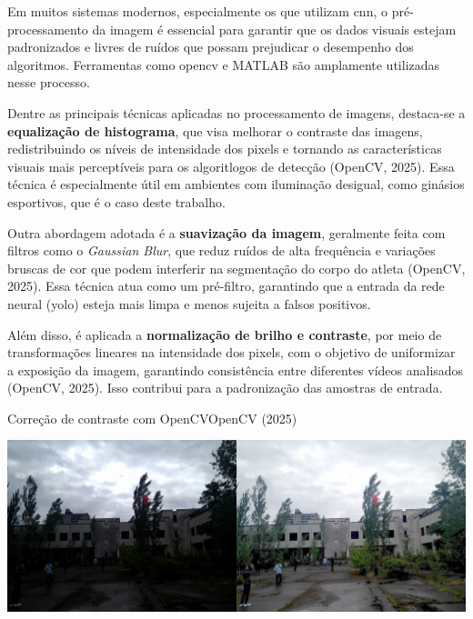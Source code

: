 Em muitos sistemas modernos, especialmente os que utilizam \ac{cnn}, o pré-processamento da imagem é essencial para garantir que os dados visuais estejam padronizados e livres de ruídos que possam prejudicar o desempenho dos algoritmos. 
Ferramentas como \ac{opencv} e MATLAB são amplamente utilizadas nesse processo.

Dentre as principais técnicas aplicadas no processamento de imagens, destaca-se a \textbf{equalização de histograma}, que visa melhorar o contraste das imagens, 
redistribuindo os níveis de intensidade dos pixels e tornando as características visuais mais perceptíveis para os algoritlogos de detecção (OpenCV, 2025). 
Essa técnica é especialmente útil em ambientes com iluminação desigual, como ginásios esportivos, que é o caso deste trabalho.

Outra abordagem adotada é a \textbf{suavização da imagem}, geralmente feita com filtros como o \textit{Gaussian Blur}, 
que reduz ruídos de alta frequência e variações bruscas de cor que podem interferir na segmentação do corpo do atleta (OpenCV, 2025). 
Essa técnica atua como um pré-filtro, garantindo que a entrada da rede neural (\ac{yolo}) esteja mais limpa e menos sujeita a falsos positivos.

Além disso, é aplicada a \textbf{normalização de brilho e contraste}, por meio de transformações lineares na intensidade dos pixels, com o objetivo de uniformizar a exposição da imagem, 
garantindo consistência entre diferentes vídeos analisados (OpenCV, 2025). Isso contribui para a padronização das amostras de entrada.

\begin{figura}{Correção de contraste com OpenCV}{OpenCV (2025)}
    \begin{flushleft}
        \label{fig:contraste-opencv}
        \includegraphics[width=0.85\linewidth]{resources/floats/ilustracoes/contraste.png}
    \end{flushleft}
\end{figura}
\FloatBarrier

